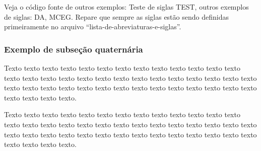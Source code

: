     Veja o código fonte de outros exemplos: Teste de siglas \gls{TEST}, outros exemplos de siglas: \gls{DA}, \gls{MCEG}. 
    Repare que sempre as siglas estão sendo definidas primeiramente no arquivo ``lista-de-abreviaturas-e-siglas''.
    
\subsubsection{Exemplo de subseção quaternária} \label{sec:quater}

Texto texto texto texto texto texto texto texto texto texto texto texto texto texto texto texto texto texto texto texto texto texto texto texto texto texto texto texto texto texto texto texto texto texto texto texto texto texto texto texto texto texto texto texto texto.


Texto texto texto texto texto texto texto texto texto texto texto texto texto texto texto texto texto texto texto texto texto texto texto texto texto texto texto texto texto texto texto texto texto texto texto texto texto texto texto texto texto texto texto texto texto.